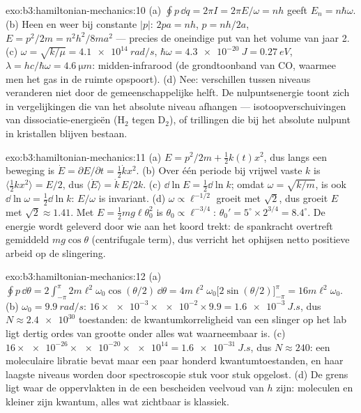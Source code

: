 \begin{solution}{exo:b3:hamiltonian-mechanics:10}
(a) $\oint p\,\dd q = 2\pi I = 2\pi E/\omega = nh$ geeft $E_n =
n\hbar\omega$. (b) Heen en weer bij constante $|p|$: $2pa = nh$, $p =
nh/2a$, $E = p^2/2m = n^2h^2/8ma^2$ --- precies de oneindige put van
het volume van jaar 2. (c) $\omega = \sqrt{k/\mu} = \qty{4.1e14}{rad/s}$,
$\hbar\omega = \qty{4.3e-20}{J} = \qty{0.27}{eV}$, $\lambda = hc/
\hbar\omega = \qty{4.6}{\micro m}$: midden-infrarood (de
grondtoonband van CO, waarmee men het gas in de ruimte opspoort). (d)
Nee: verschillen tussen niveaus veranderen niet door de gemeenschappelijke
helft. De nulpuntsenergie toont zich in vergelijkingen die van het
absolute niveau afhangen --- isotoopverschuivingen van
dissociatie-energieën (H$_2$ tegen D$_2$), of trillingen die bij het
absolute nulpunt in kristallen blijven bestaan.
\end{solution}

\begin{solution}{exo:b3:hamiltonian-mechanics:11}
(a) $E = p^2/2m + \tfrac12 k(t)x^2$, dus langs een beweging is $\dot E =
\partial E/\partial t = \tfrac12\dot kx^2$. (b) Over één periode bij
vrijwel vaste $k$ is $\langle\tfrac12 kx^2\rangle = E/2$, dus
$\langle\dot E\rangle = \dot k\,E/2k$. (c) $\dd\ln E = \tfrac12\dd\ln
k$; omdat $\omega = \sqrt{k/m}$, is ook $\dd\ln\omega = \tfrac12\dd\ln k$:
$E/\omega$ is invariant. (d) $\omega \propto \ell^{-1/2}$ groeit met
$\sqrt2$, dus groeit $E$ met $\sqrt2 \approx 1.41$. Met $E = \tfrac12
mg\ell\theta_0^2$ is $\theta_0 \propto \ell^{-3/4}$: $\theta_0' =
5^\circ \times 2^{3/4} = 8.4^\circ$. De energie wordt geleverd door wie
aan het koord trekt: de spankracht overtreft gemiddeld $mg\cos\theta$
(centrifugale term), dus verricht het ophijsen netto positieve arbeid op
de slingering.
\end{solution}

\begin{solution}{exo:b3:hamiltonian-mechanics:12}
(a) $\oint p\,\dd\theta = 2\int_{-\pi}^{\pi}2m\ell^2\omega_0
\cos(\theta/2)\,\dd\theta = 4m\ell^2\omega_0\big[2\sin(\theta/2)
\big]_{-\pi}^{\pi} = 16m\ell^2\omega_0$. (b) $\omega_0 =
\qty{9.9}{rad/s}$: $16 \times \num{e-3} \times \num{e-2} \times 9.9 =
\qty{1.6e-3}{J.s}$, dus $N \approx \num{2.4e30}$ toestanden: de
kwantumkorreligheid van een slinger op het lab ligt dertig ordes van
grootte onder alles wat waarneembaar is. (c) $16 \times \num{e-26} \times
\num{e-20} \times \num{e14} = \qty{1.6e-31}{J.s}$, dus $N \approx
240$: een moleculaire libratie bevat maar een paar honderd
kwantumtoestanden, en haar laagste niveaus worden door spectroscopie
stuk voor stuk opgelost. (d) De grens ligt waar de oppervlakten in de
 een bescheiden veelvoud van $h$ zijn: moleculen en kleiner
zijn kwantum, alles wat zichtbaar is klassiek.
\end{solution}

